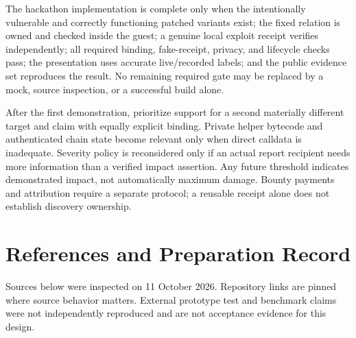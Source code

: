 \documentclass[11pt]{article}
\begin{document}
The hackathon implementation is complete only when the intentionally vulnerable and correctly functioning patched variants exist; the fixed relation is owned and checked inside the guest; a genuine local exploit receipt verifies independently; all required binding, fake-receipt, privacy, and lifecycle checks pass; the presentation uses accurate live/recorded labels; and the public evidence set reproduces the result. No remaining required gate may be replaced by a mock, source inspection, or a successful build alone.

After the first demonstration, prioritize support for a second materially different target and claim with equally explicit binding. Private helper bytecode and authenticated chain state become relevant only when direct calldata is inadequate. Severity policy is reconsidered only if an actual report recipient needs more information than a verified impact assertion. Any future threshold indicates demonstrated impact, not automatically maximum damage. Bounty payments and attribution require a separate protocol; a reusable receipt alone does not establish discovery ownership.

\section{References and Preparation Record}
Sources below were inspected on 11 October 2026. Repository links are pinned where source behavior matters. External prototype test and benchmark claims were not independently reproduced and are not acceptance evidence for this design.
\end{document}
